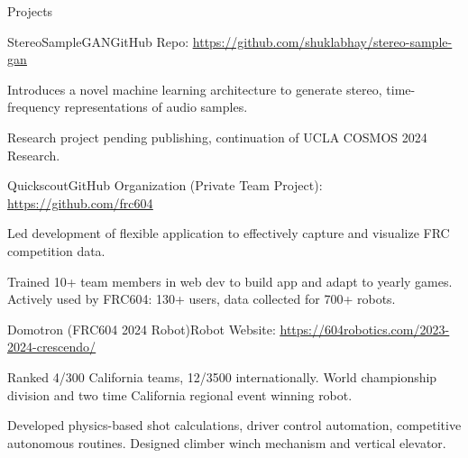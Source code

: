 \documentclass[
  11pt, %
]{public/resume/resume} %
\begin{document}

\begin{rSection}{Projects}

  
  \begin{rSubsection}{StereoSampleGAN}{}{GitHub Repo: \underline{\href{https://github.com/shuklabhay/stereo-sample-gan}{https://github.com/shuklabhay/stereo-sample-gan}}}{}
       
    \item Introduces a novel machine learning architecture to generate stereo, time-frequency representations of audio samples.
        
    \item Research project pending publishing, continuation of UCLA COSMOS 2024 Research.
        
  \end{rSubsection}
      
  \begin{rSubsection}{Quickscout}{}{GitHub Organization (Private Team Project): \underline{\href{https://github.com/frc604}{https://github.com/frc604}}}{}
       
    \item Led development of flexible application to effectively capture and visualize FRC competition data.
        
    \item Trained 10+ team members in web dev to build app and adapt to yearly games. Actively used by FRC604: 130+ users, data collected for 700+ robots.
        
  \end{rSubsection}
      
  \begin{rSubsection}{Domotron (FRC604 2024 Robot)}{}{Robot Website: \underline{\href{https://604robotics.com/2023-2024-crescendo/}{https://604robotics.com/2023-2024-crescendo/}}}{}
       
    \item Ranked 4/300 California teams, 12/3500 internationally. World championship division and two time California regional event winning robot.
        
    \item Developed physics-based shot calculations, driver control automation, competitive autonomous routines. Designed climber winch mechanism and vertical elevator.
        

\end{rSubsection}
\end{rSection}
\end{document}
